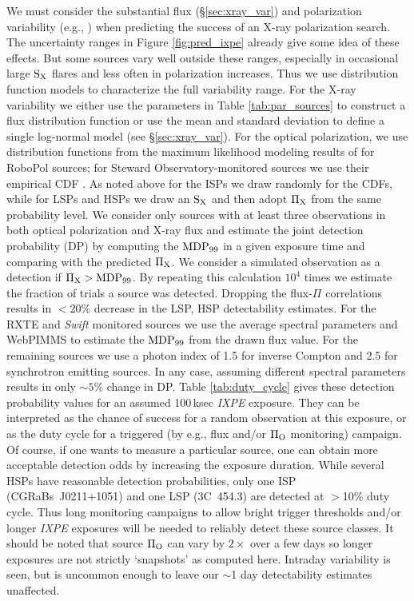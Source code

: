 We must consider the substantial flux (\S \ref{sec:xray_var}) and polarization variability (e.g., \citealp{angelakis_robopol_2016,kiehlmann_optical_2017}) when predicting the success of an X-ray polarization search. The uncertainty ranges in Figure \ref{fig:pred_ixpe} already give
some idea of these effects. But some sources vary well outside these ranges, especially
in occasional large $\rm S_X$ flares and less often in polarization increases. Thus we use
distribution function models to characterize the full variability range. For the X-ray variability we either use the parameters in Table \ref{tab:par_sources} to construct a flux distribution function or use the mean and standard deviation to define a single log-normal model (see \S \ref{sec:xray_var}). For the optical polarization, we use distribution 
functions from the maximum likelihood modeling results of \cite{angelakis_robopol_2016} for RoboPol sources; for Steward Observatory-monitored sources we use their empirical CDF \citep{smith_coordinated_2009}. As noted above for the ISPs we draw randomly for the CDFs, while for LSPs and HSPs we draw an $\rm S_X$ and then adopt $\rm \Pi_X$ from the same probability level.  We consider only sources with at least three observations in both optical polarization and X-ray 
flux and estimate the joint detection probability (DP) by computing the $\rm MDP_{99}$ in a given exposure time and comparing with the predicted $\rm \Pi_X$. We consider
a simulated observation as a detection if $\rm \Pi_X > MDP_{99}$. By repeating this 
calculation $10^4$ times we estimate the fraction of trials a source was detected. 
Dropping the flux-$\Pi$ correlations results in $<20\%$ decrease in the LSP, HSP 
detectability estimates. For the RXTE and {\it Swift} monitored sources we use the average spectral parameters and WebPIMMS to estimate the $\rm MDP_{99}$ from the drawn flux value. For the remaining sources we use a photon index of 1.5 for inverse Compton and 2.5 for synchrotron emitting sources. In any case, assuming different spectral parameters results in only $\sim 5\%$ change in DP. Table \ref{tab:duty_cycle} gives these detection probability values for an assumed 100\,ksec {\it IXPE} exposure. They can be interpreted as the chance of success for a random observation at this exposure, or as the duty cycle for a triggered (by e.g., flux and/or $\rm \Pi_O$ monitoring) campaign. Of course, if one wants to measure a particular source, one can obtain more acceptable detection odds by increasing the exposure duration. While several HSPs have reasonable detection probabilities, only one ISP (CGRaBs~J0211+1051) and one LSP (3C~454.3) are detected at $>$10\% duty cycle. Thus long monitoring campaigns to allow bright trigger thresholds and/or longer {\it IXPE} exposures will be needed to reliably detect these source classes. It should be noted that source $\rm \Pi_O$ can vary by $2\times$ over a few days so longer exposures are not strictly `snapshots' as computed here. Intraday variability is seen, but is uncommon enough to leave our $\sim$1 day detectability estimates unaffected.

